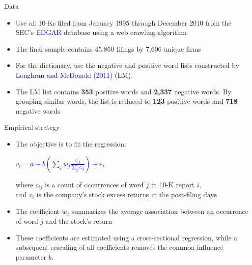 \documentclass[english]{beamer}
\begin{document}
\begin{frame}{Data}
\begin{itemize}
\setlength{\itemsep}{1.5em}
\item Use all 10-Ks filed from January 1995 through December 2010 from the SEC's \textcolor{blue}{EDGAR} database using a web crawling algorithm
\item The final sample contains 45,860 filings by 7,606 unique firms
\item For the dictionary, use the negative and positive word lists constructed by \textcolor{blue}{Loughran and McDonald (2011)} (LM).
\item The LM list contains \textbf{353} positive words and \textbf{2,337} negative words. By grouping similar words, the list is reduced to \textbf{123} positive words and \textbf{718} negative words
\end{itemize}
\end{frame}%
%
\begin{frame}{Empirical strategy}
\begin{itemize}
\setlength{\itemsep}{1.5em}
\item The objective is to fit the regression: 

\vspace{5pt}
\begin{center}
\textcolor{blue}{$
v_{i}=a+b\left(\sum_{j} w_{j} \frac{c_{i j}}{\sum_{j} c_{i j}}\right)+\varepsilon_{i}
$}
\end{center}
\vspace{5pt}


where \textcolor{blue}{$c_{ij}$} is a count of occurrences of word \textcolor{blue}{$j$} in 10-K report \textcolor{blue}{$i$}, \\
and \textcolor{blue}{$v_{i}$} is the company's stock excess returns in the post-filing days

\item The coefficient \textcolor{blue}{$w_j$} summarizes the average association between an occurrence of word \textcolor{blue}{$j$} and the stock's return
\item These coefficients are estimated using a cross-sectional regression, while a subsequent rescaling of all coefficients removes the common influence parameter \textcolor{blue}{$b$}.
\end{itemize}
\end{frame}%
\end{document}
